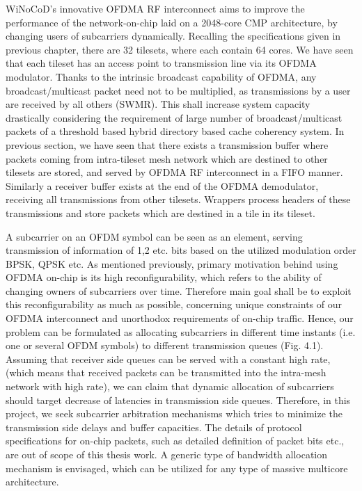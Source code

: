 WiNoCoD's innovative OFDMA RF interconnect aims to improve the performance of the network-on-chip laid on a 2048-core CMP architecture, by changing users of subcarriers dynamically. Recalling the specifications given in previous chapter, there are 32 tilesets, where each contain 64 cores. We have seen that each tileset has an access point to transmission line via its OFDMA modulator. Thanks to the intrinsic broadcast capability of OFDMA, any broadcast/multicast packet need not to be multiplied, as transmissions by a user are received by all others (SWMR). This shall increase system capacity drastically considering the requirement of large number of broadcast/multicast packets of a threshold based hybrid directory based cache coherency system. In previous section, we have seen that there exists a transmission buffer where packets coming from intra-tileset mesh network which are destined to other tilesets are stored, and served by OFDMA RF interconnect in a FIFO manner. Similarly a receiver buffer exists at the end of the OFDMA demodulator, receiving all transmissions from other tilesets. Wrappers process headers of these transmissions and store packets which are destined in a tile in its tileset. 

A subcarrier on an OFDM symbol can be seen as an element, serving transmission of information of 1,2 etc. bits based on the utilized modulation order BPSK, QPSK etc. As mentioned previously, primary motivation behind using OFDMA on-chip is its high reconfigurability, which refers to the ability of changing owners of subcarriers over time. Therefore main goal shall be to exploit this reconfigurability as much as possible, concerning unique constraints of our OFDMA interconnect and unorthodox requirements of on-chip traffic. Hence, our problem can be formulated as allocating subcarriers in different time instants (i.e. one or several OFDM symbols) to different transmission queues (Fig. 4.1). Assuming that receiver side queues can be served with a constant high rate, (which means that received packets can be transmitted into the intra-mesh network with high rate), we can claim that dynamic allocation of subcarriers should target decrease of latencies in transmission side queues. Therefore, in this project, we seek subcarrier arbitration mechanisms which tries to minimize the transmission side delays and buffer capacities. The details of protocol specifications for on-chip packets, such as detailed definition of packet bits etc., are out of scope of this thesis work. A generic type of bandwidth allocation mechanism is envisaged, which can be utilized for any type of massive multicore architecture. 


